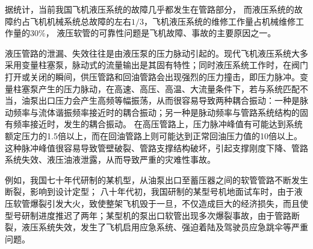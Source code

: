 据统计，当前我国飞机液压系统的故障几乎都发生在管路部分，
而液压系统的故障约占飞机机械系统总故障的左右$1/3 $，飞机液压系统的维修工作量占机械维修工作量的$ 30\%$\cite{lijun2007}，
液压软管的可靠性问题是飞机故障、事故的主要原因之一。

液压管路的泄漏、失效往往是由液压泵的压力脉动引起的。现代飞机液压系统大多采用变量柱塞泵，脉动式的流量输出是其固有特性；同时液压系统工作时，在阀门打开或关闭的瞬间，供压管路和回油管路会出现强烈的压力撞击，即压力脉冲。变量柱塞泵产生的压力脉动，在高速、高压、高温、大流量条件下，若与系统匹配不当，油泵出口压力会产生高频等幅振荡，从而很容易导致两种耦合振动：一种是脉动频率与流体谐振频率接近时的耦合振动；另一种是脉动频率与管路系统结构的固有频率接近时，发生的耦合振动。
在高压管路上，压力脉冲峰值有可能达到系统额定压力的1.5倍以上，而在回油管路上则可能达到正常回油压力值的10倍以上\cite{lijun2007}。
这种脉冲峰值很容易导致管壁破裂、管路支撑结构破坏，引起支撑刚度下降、管路系统失效、液压油液泄露，从而导致严重的灾难性事故\cite{gaofeng2013}。


例如，我国七十年代研制的某机型，从油泵出口至蓄压器之间的软管管路不断发生断裂，影响到设计定型；
八十年代初，我国研制的某型号机地面试车时，由于液压软管爆裂引发大火，致使整架飞机毁于一旦，不仅造成巨大的经济损失，而且使型号研制进度推迟了两年；某型机的泵出口软管出现多次爆裂事故，由于管路断裂，液压系统失效，发生了飞机启用应急系统、强迫着陆及驾驶员应急跳伞等严重问题\cite{lijun2007,guoqing2010,gaofeng2013}。

\begin{figure}
	\centering
	\hspace{1cm}
	\label{fig:plane-hose}
\end{figure}



